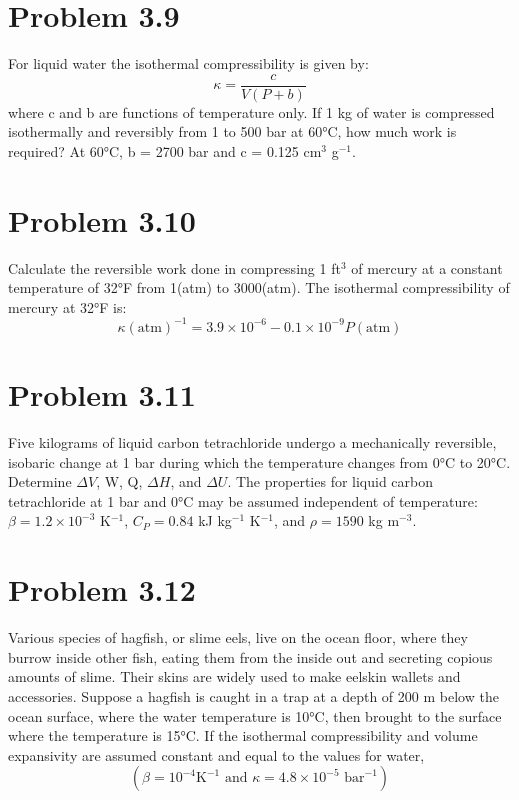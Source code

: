 \documentclass{article}
\begin{document}
\section*{Problem 3.9}
For liquid water the isothermal compressibility is given by:
$$ \kappa = \frac{c}{V(P+b)} $$
where c and b are functions of temperature only. If 1 kg of water is compressed isothermally and reversibly from 1 to 500 bar at 60°C, how much work is required? At 60°C, b = 2700 bar and c = 0.125 cm$^3$ g$^{-1}$.

\section*{Problem 3.10}
Calculate the reversible work done in compressing 1 ft$^3$ of mercury at a constant temperature of 32°F from 1(atm) to 3000(atm). The isothermal compressibility of mercury at 32°F is:
$$ \kappa(\text{atm})^{-1} = 3.9 \times 10^{-6} - 0.1 \times 10^{-9} P(\text{atm}) $$

\section*{Problem 3.11}
Five kilograms of liquid carbon tetrachloride undergo a mechanically reversible, isobaric change at 1 bar during which the temperature changes from 0°C to 20°C. Determine $\Delta V$, W, Q, $\Delta H$, and $\Delta U$. The properties for liquid carbon tetrachloride at 1 bar and 0°C may be assumed independent of temperature: $\beta = 1.2 \times 10^{-3}$ K$^{-1}$, $C_P = 0.84$ kJ kg$^{-1}$ K$^{-1}$, and $\rho = 1590$ kg m$^{-3}$.

\section*{Problem 3.12}
Various species of hagfish, or slime eels, live on the ocean floor, where they burrow inside other fish, eating them from the inside out and secreting copious amounts of slime. Their skins are widely used to make eelskin wallets and accessories. Suppose a hagfish is caught in a trap at a depth of 200 m below the ocean surface, where the water temperature is 10°C, then brought to the surface where the temperature is 15°C. If the isothermal compressibility and volume expansivity are assumed constant and equal to the values for water,
$$ (\beta = 10^{-4} \text{K}^{-1} \text{ and } \kappa = 4.8 \times 10^{-5} \text{ bar}^{-1}) $$
\end{document}
